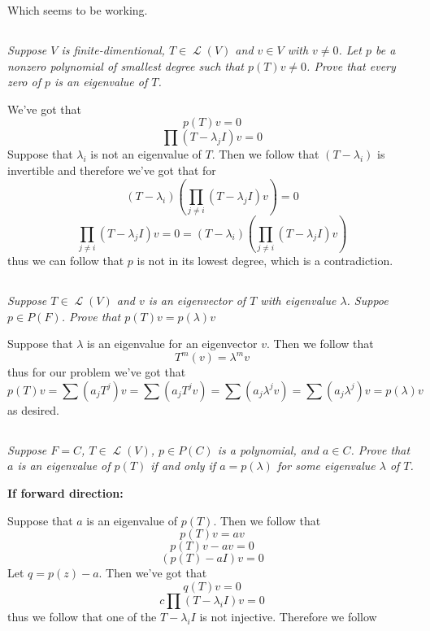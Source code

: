 \documentclass[11pt,oneside,titlepage]{book}
\DeclareMathOperator \map {\mathcal {L}}
\begin{document}
Which seems to be working.

\subsection{}

\textit{Suppose $V$ is finite-dimentional, $T \in \map(V)$ and $v \in V$ with $v \neq 0$.
  Let $p$ be a nonzero polynomial of smallest degree such that $p(T)v \neq 0$. Prove that every
  zero  of $p$ is an eigenvalue of $T$.}

We've got that
$$p(T)v = 0$$
$$\prod{(T - \lambda_j I)}v = 0$$
Suppose that $\lambda_i$ is not an eigenvalue of $T$. Then we follow that $(T - \lambda_i)$ is
invertible and therefore we've got that for 
$$(T - \lambda_i)\left(\prod_{j \neq i}{(T - \lambda_j I)} v \right) = 0$$
$$\prod_{j \neq i}{(T - \lambda_j I)} v  = 0 =
(T - \lambda_i)\left(\prod_{j \neq i}{(T - \lambda_j I)} v \right)$$
thus we can follow that $p$ is not in its lowest degree, which is a contradiction.

\subsection{}

\textit{Suppose $T \in \map(V)$ and $v$ is an eigenvector of $T$ with eigenvalue $\lambda$.
  Suppoe $p \in P(F)$. Prove that $p(T)v = p(\lambda)v$}

Suppose that $\lambda$ is an eigenvalue for an eigenvector $v$. Then we follow that
$$T^m(v) = \lambda^m v$$
thus for our problem we've got that
$$p(T)v = \sum{(a_j T^j)}v = \sum{(a_j T^j v)} = \sum{(a_j \lambda^j v)} =
\sum{(a_j \lambda^j )}v = p(\lambda)v $$
as desired.

\subsection{}

\textit{Suppose $F = C$, $T \in \map(V)$, $p \in P(C)$ is a polynomial, and $a \in C$.
  Prove that $a$ is an eigenvalue of $p(T)$ if and only if $a = p(\lambda)$ for some
  eigenvalue $\lambda$ of $T$.}

\textbf{If forward direction: }

Suppose that $a$ is an eigenvalue of $p(T)$. Then we follow that
$$p(T)v = a v$$
$$p(T)v - av = 0$$
$$(p(T) - aI)v = 0$$
Let $q = p(z) - a$. Then we've got that 
$$q(T)v = 0$$
$$c \prod(T - \lambda_i I)v = 0$$
thus we follow that one of the $T - \lambda_i I$ is not injective. Therefore we follow 
\end{document}
